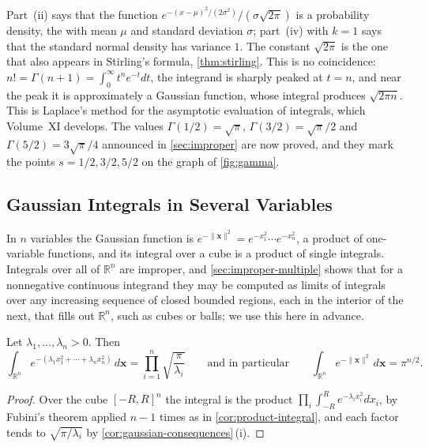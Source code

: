 Part~(ii) says that the function $e^{-(x-\mu)^2/(2\sigma^2)}/(\sigma\sqrt{2\pi})$ is a probability density, the  with mean $\mu$ and standard deviation $\sigma$; part~(iv) with $k=1$ says that the standard normal density has variance $1$. The constant $\sqrt{2\pi}$ is the one that also appears in Stirling's formula, \cref{thm:stirling}. This is no coincidence: $n!=\Gamma(n+1)=\int_0^\infty t^ne^{-t}dt$, the integrand is sharply peaked at $t=n$, and near the peak it is approximately a Gaussian function, whose integral produces $\sqrt{2\pi n}$. This is Laplace's method for the asymptotic evaluation of integrals, which Volume~XI develops. The values $\Gamma(1/2)=\sqrt\pi$, $\Gamma(3/2)=\sqrt\pi/2$ and $\Gamma(5/2)=3\sqrt\pi/4$ announced in \cref{sec:improper} are now proved, and they mark the points $s=1/2,3/2,5/2$ on the graph of \cref{fig:gamma}.

\subsection{Gaussian Integrals in Several Variables}

In $n$ variables the Gaussian function is $e^{-\|\mathbf x\|^2}=e^{-x_1^2}\cdots e^{-x_n^2}$, a product of one-variable functions, and its integral over a cube is a product of single integrals. Integrals over all of $\mathbb R^n$ are improper, and \cref{sec:improper-multiple} shows that for a nonnegative continuous integrand they may be computed as limits of integrals over any increasing sequence of closed bounded regions, each in the interior of the next, that fills out $\mathbb R^n$, such as cubes or balls; we use this here in advance.

\begin{proposition}
\label{prop:gaussian-n}
Let $\lambda_1,\ldots,\lambda_n>0$. Then
\[
\int_{\mathbb R^n}e^{-(\lambda_1x_1^2+\cdots+\lambda_nx_n^2)}\,d\mathbf x=\prod_{i=1}^n\sqrt{\frac\pi{\lambda_i}}\qquad\text{and in particular}\qquad\int_{\mathbb R^n}e^{-\|\mathbf x\|^2}\,d\mathbf x=\pi^{n/2}.
\]
\end{proposition}

\begin{proof}
Over the cube $[-R,R]^n$ the integral is the product $\prod_i\int_{-R}^Re^{-\lambda_ix_i^2}dx_i$, by Fubini's theorem applied $n-1$ times as in \cref{cor:product-integral}, and each factor tends to $\sqrt{\pi/\lambda_i}$ by \cref{cor:gaussian-consequences}\,(i).
\end{proof}

